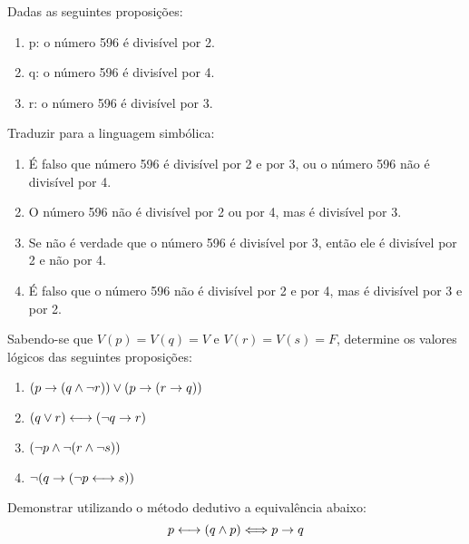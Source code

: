 \documentclass[a4paper, 11pt]{article}
\begin{document}
    \begin{question}
        Dadas as seguintes proposições:
        \vspace{-3mm}
        \begin{enumerate}[itemsep=-1mm]
            \item[] p: o número 596 é divisível por 2.
            \item[] q: o número 596 é divisível por 4.
            \item[] r: o número 596 é divisível por 3.
        \end{enumerate}
        Traduzir para a linguagem simbólica:
        \vspace{-3mm}
        \begin{enumerate}[itemsep=-1mm, label = {\alph*.}]
            \item É falso que número 596 é divisível por 2 e por 3, ou o número 596 não é divisível por 4.
            \item O número 596 não é divisível por 2 ou por 4, mas é divisível por 3.
            \item Se não é verdade que o número 596 é divisível por 3, então ele é divisível por 2 e não por 4.
            \item É falso que o número 596 não é divisível por 2 e por 4, mas é divisível por 3 e por 2.
        \end{enumerate}
    \end{question}

    \begin{question}
        Sabendo-se que $V(p) = V(q) = V$ e $V(r) = V(s) = F$, determine os valores lógicos das seguintes proposições:
        \vspace{-3mm}
        \begin{enumerate}[itemsep=-1mm]
            \item $(p \rightarrow (q \land \lnot r)) \lor (p \rightarrow (r \rightarrow q))$
            \item $(q \lor r) \longleftrightarrow (\lnot q \rightarrow r)$
            \item $(\lnot p \land \lnot(r \land \lnot s))$
            \item $\lnot (q \rightarrow (\lnot p \longleftrightarrow s))$
        \end{enumerate}
    \end{question}

    \begin{question}
        Demonstrar utilizando o método dedutivo a equivalência abaixo:
        \vspace*{-3mm}
        \begin{equation*}
            p \longleftrightarrow(q \land p) \Longleftrightarrow  p \rightarrow q
        \end{equation*}
    \end{question}
\end{document}
